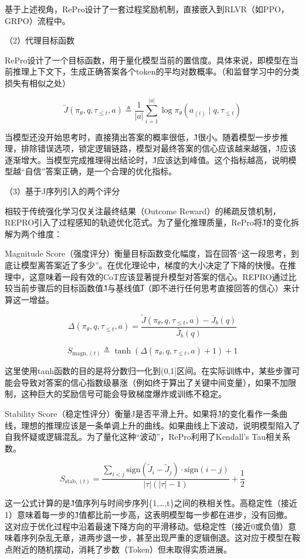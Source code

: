 基于上述视角，RePro设计了一套过程奖励机制，直接嵌入到RLVR（如PPO，GRPO）流程中。

（2）代理目标函数

RePro设计了一个目标函数，用于量化模型当前的置信度。具体来说，即模型在当前推理上下文下，生成正确答案各个token的平均对数概率。（和监督学习中的分类损失有相似之处）

\[
\tilde{J}(\pi_\theta, q, \tau_{\le t}, a)
\triangleq
\frac{1}{|a|}\sum_{i=1}^{|a|}
\log \pi_\theta(a_{(i)} \mid q, \tau_{\le t})
\]

当模型还没开始思考时，直接猜出答案的概率很低，J̃很小。随着模型一步步推理，排除错误选项，锁定逻辑链路，模型对最终答案的信心应该越来越强，J̃应该逐渐增大。当模型完成推理得出结论时，J̃应该达到峰值。这个指标越高，说明模型越``自信''答案正确，是一个合理的优化指标。

（3）基于J序列引入的两个评分

相较于传统强化学习仅关注最终结果（Outcome Reward）的稀疏反馈机制，REPRO引入了过程感知的轨迹优化范式。为了量化推理质量，RePro将J̃的变化拆解为两个维度：

Magnitude Score（强度评分）衡量目标函数变化幅度，旨在回答``这一段思考，到底让模型离答案近了多少''。在优化理论中，梯度的大小决定了下降的快慢。在推理中，这意味着一段有效的CoT应该显著提升模型对答案的信心。REPRO通过比较当前步骤后的目标函数值J̃与基线值J̅（即不进行任何思考直接回答的信心）来计算这一增益。

\[
\Delta(\pi_\theta, q, \tau_{\le t}, a)
=
\frac{
\tilde{J}(\pi_\theta, q, \tau_{\le t}, a) - \bar{J}_b(q)
}{
\bar{J}_b(q)
}
\]

\[
S_{\mathrm{magn},(t)}
\triangleq
\tanh\left(\Delta(\pi_\theta, q, \tau_{\le t}, a) + 1\right) + 1
\]

这里使用tanh函数的目的是将分数归一化到(0,1{]}区间。在实际训练中，某些步骤可能会导致对答案的信心指数级暴涨（例如终于算出了关键中间变量），如果不加限制，这种巨大的奖励信号可能会导致梯度爆炸或训练不稳定。

Stability Score（稳定性评分）衡量J是否平滑上升。如果将J̃的变化看作一条曲线，理想的推理应该是一条单调上升的曲线。如果曲线上下波动，说明模型陷入了自我怀疑或逻辑混乱。为了量化这种``波动''，RePro利用了Kendall's Tau相关系数。

\[
S_{\mathrm{stab},(t)}
=
\frac{
\sum_{i < j}
\mathrm{sign}(\tilde{J}_i - \tilde{J}_j)\cdot \mathrm{sign}(i - j)
}{
|\tau|(|\tau| - 1)
}
+
\frac{1}{2}
\]

这一公式计算的是J̃值序列与时间步序列\{1,\ldots,t\}之间的秩相关性。高稳定性（接近1）意味着每一步的J̃值都比前一步高，这表明模型每一步都在进步，没有回撤。这对应于优化过程中沿着最速下降方向的平滑移动。低稳定性（接近0或负值）意味着序列杂乱无章，进两步退一步，甚至出现严重的逻辑倒退。这对应于模型在鞍点附近的随机摆动，消耗了步数（Token）但未取得实质进展。

